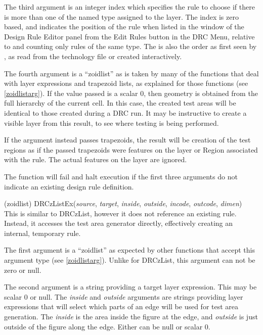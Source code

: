 \begin{description}
The third argument is an integer index which specifies the rule to
choose if there is more than one of the named type assigned to the
layer.  The index is zero based, and indicates the position of the
rule when listed in the window of the {\cb Design Rule Editor} panel
from the {\cb Edit Rules} button in the {\cb DRC Menu}, relative to
and counting only rules of the same type.  The is also the order as
first seen by {\Xic}, as read from the technology file or created
interactively.

The fourth argument is a ``zoidlist'' as is taken by many of the
functions that deal with layer expressions and trapezoid lists, as
explained for those functions (see \ref{zoidlistarg}).  If the value
passed is a scalar 0, then geometry is obtained from the full
hierarchy of the current cell.  In this case, the created test areas
will be identical to those created during a DRC run.  It may be
instructive to create a visible layer from this result, to see where
testing is being performed.

If the argument instead passes trapezoids, the result will be creation
of the test regions as if the passed trapezoids were features on the
layer or {\vt Region} associated with the rule.  The actual features
on the layer are ignored.

The function will fail and halt execution if the first three
arguments do not indicate an existing design rule definition.

\item{(zoidlist) \vt DRCzListEx({\it source\/}, {\it target\/},
 {\it inside\/}, {\it outside\/}, {\it incode\/}, {\it outcode\/},
 {\it dimen\/})}\\
This is similar to {\vt DRCzList}, however it does not reference an
existing rule.  Instead, it accesses the test area generator directly,
effectively creating an internal, temporary rule.

The first argument is a ``zoidlist'' as expected by other functions
that accept this argument type (see \ref{zoidlistarg}).  Unlike for
{\vt DRCzList}, this argument can not be zero or null.

The second argument is a string providing a target layer expression. 
This may be scalar 0 or null.  The {\it inside} and {\it outside}
arguments are strings providing layer expressions that will select
which parts of an edge will be used for test area generation.  The
{\it inside} is the area inside the figure at the edge, and {\it
outside} is just outside of the figure along the edge.  Either can be
null or scalar 0.


\end{description}
